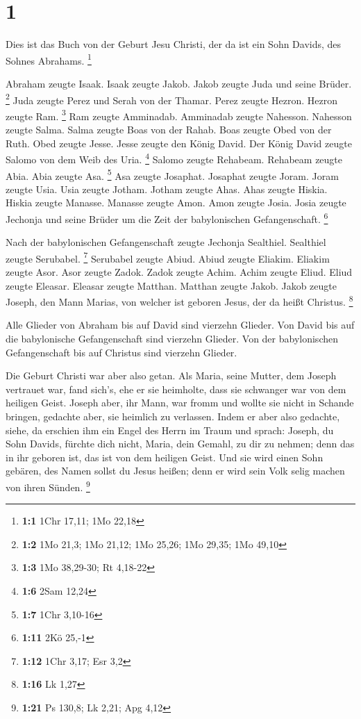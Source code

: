 \hypertarget{section}{%
\section{1}\label{section}}

 Dies ist das Buch von der Geburt Jesu Christi, der da ist
ein Sohn Davids, des Sohnes Abrahams. \footnote{\textbf{1:1} 1Chr 17,11;
  1Mo 22,18}

 Abraham zeugte Isaak. Isaak zeugte Jakob. Jakob zeugte
Juda und seine Brüder. \footnote{\textbf{1:2} 1Mo 21,3; 1Mo 21,12; 1Mo
  25,26; 1Mo 29,35; 1Mo 49,10}  Juda zeugte Perez und
Serah von der Thamar. Perez zeugte Hezron. Hezron zeugte Ram.
\footnote{\textbf{1:3} 1Mo 38,29-30; Rt 4,18-22}  Ram
zeugte Amminadab. Amminadab zeugte Nahesson. Nahesson zeugte Salma.
 Salma zeugte Boas von der Rahab. Boas zeugte Obed von der
Ruth. Obed zeugte Jesse.  Jesse zeugte den König David.
Der König David zeugte Salomo von dem Weib des Uria. \footnote{\textbf{1:6}
  2Sam 12,24}  Salomo zeugte Rehabeam. Rehabeam zeugte
Abia. Abia zeugte Asa. \footnote{\textbf{1:7} 1Chr 3,10-16}
 Asa zeugte Josaphat. Josaphat zeugte Joram. Joram zeugte
Usia.  Usia zeugte Jotham. Jotham zeugte Ahas. Ahas zeugte
Hiskia.  Hiskia zeugte Manasse. Manasse zeugte Amon. Amon
zeugte Josia.  Josia zeugte Jechonja und seine Brüder um
die Zeit der babylonischen Gefangenschaft. \footnote{\textbf{1:11} 2Kö
  25,-1}

 Nach der babylonischen Gefangenschaft zeugte Jechonja
Sealthiel. Sealthiel zeugte Serubabel. \footnote{\textbf{1:12} 1Chr
  3,17; Esr 3,2}  Serubabel zeugte Abiud. Abiud zeugte
Eliakim. Eliakim zeugte Asor.  Asor zeugte Zadok. Zadok
zeugte Achim. Achim zeugte Eliud.  Eliud zeugte Eleasar.
Eleasar zeugte Matthan. Matthan zeugte Jakob.  Jakob
zeugte Joseph, den Mann Marias, von welcher ist geboren Jesus, der da
heißt Christus. \footnote{\textbf{1:16} Lk 1,27}

 Alle Glieder von Abraham bis auf David sind vierzehn
Glieder. Von David bis auf die babylonische Gefangenschaft sind vierzehn
Glieder. Von der babylonischen Gefangenschaft bis auf Christus sind
vierzehn Glieder.

 Die Geburt Christi war aber also getan. Als Maria, seine
Mutter, dem Joseph vertrauet war, fand sich's, ehe er sie heimholte,
dass sie schwanger war von dem heiligen Geist.  Joseph
aber, ihr Mann, war fromm und wollte sie nicht in Schande bringen,
gedachte aber, sie heimlich zu verlassen.  Indem er aber
also gedachte, siehe, da erschien ihm ein Engel des Herrn im Traum und
sprach: Joseph, du Sohn Davids, fürchte dich nicht, Maria, dein Gemahl,
zu dir zu nehmen; denn das in ihr geboren ist, das ist von dem heiligen
Geist.  Und sie wird einen Sohn gebären, des Namen sollst
du Jesus heißen; denn er wird sein Volk selig machen von ihren Sünden.
\footnote{\textbf{1:21} Ps 130,8; Lk 2,21; Apg 4,12}

